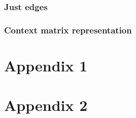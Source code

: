 \documentclass{article}
\begin{document}
  \subsubsection{Just edges}
  
  \subsubsection{Context matrix representation}
 
 \newpage
 
 {} 
 
 \newpage
 \begin{appendices}
  \section{Appendix 1}
  \section{Appendix 2}
 \end{appendices}
 
 
\end{document}
